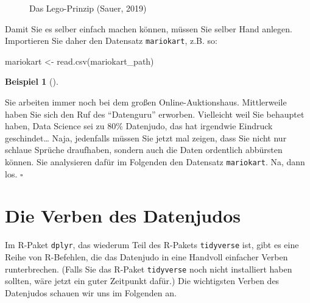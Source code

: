 \documentclass[
  letterpaper,
]{scrbook}
\newenvironment{Shaded}{\begin{snugshade}}{\end{snugshade}}
\newcommand{\FunctionTok}[1]{\textcolor[rgb]{0.28,0.35,0.67}{#1}}
\newcommand{\NormalTok}[1]{\textcolor[rgb]{0.00,0.23,0.31}{#1}}
\newcommand{\OtherTok}[1]{\textcolor[rgb]{0.00,0.23,0.31}{#1}}
\theoremstyle{definition}
\theoremstyle{definition}
\newtheorem{example}{Beispiel}[chapter]
\theoremstyle{definition}
\theoremstyle{remark}
\begin{document}
\begin{figure}


\caption{\label{fig-lego}Das Lego-Prinzip (Sauer, 2019)}

\end{figure}%

Damit Sie es selber einfach machen können, müssen Sie selber Hand
anlegen. Importieren Sie daher den Datensatz \texttt{mariokart}, z.B.
so:

\begin{Shaded}
\begin{Highlighting}[]
\NormalTok{mariokart }\OtherTok{\textless{}{-}} \FunctionTok{read.csv}\NormalTok{(mariokart\_path)}
\end{Highlighting}
\end{Shaded}

\begin{example}[]\protect\hypertarget{exm-datenjudo}{}\label{exm-datenjudo}

Sie arbeiten immer noch bei dem großen Online-Auktionshaus. Mittlerweile
haben Sie sich den Ruf des \enquote{Datenguru} erworben. Vielleicht weil
Sie behauptet haben, Data Science sei zu 80\% Datenjudo, das hat
irgendwie Eindruck geschindet\ldots{} Naja, jedenfalls müssen Sie jetzt
mal zeigen, dass Sie nicht nur schlaue Sprüche draufhaben, sondern auch
die Daten ordentlich abbürsten können. Sie analysieren dafür im
Folgenden den Datensatz \texttt{mariokart}. Na, dann los. \(\square\)

\end{example}

\section{Die Verben des Datenjudos}\label{die-verben-des-datenjudos}

Im R-Paket \texttt{dplyr}, das wiederum Teil des R-Pakets
\texttt{tidyverse} ist, gibt es eine Reihe von R-Befehlen, die das
Datenjudo in eine Handvoll einfacher Verben runterbrechen. (Falls Sie
das R-Paket \texttt{tidyverse} noch nicht installiert haben sollten,
wäre jetzt ein guter Zeitpunkt dafür.) Die wichtigsten Verben des
Datenjudos schauen wir uns im Folgenden an.
\end{document}
